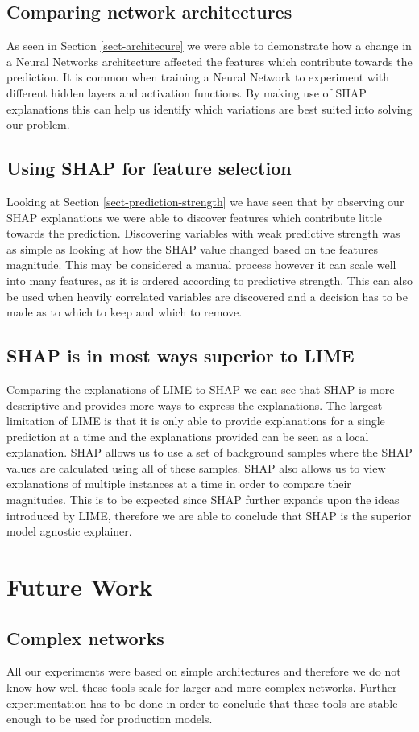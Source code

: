 \subsection{Comparing network architectures}
As seen in Section \ref{sect-architecure} we were able to demonstrate how a change in a Neural Networks architecture affected the features which contribute towards the prediction. It is common when training a Neural Network to experiment with different hidden layers and activation functions. By making use of SHAP explanations this can help us identify which variations are best suited into solving our problem.
\subsection{Using SHAP for feature selection}
Looking at Section \ref{sect-prediction-strength} we have seen that by observing our SHAP explanations we were able to discover features which contribute little towards the prediction. Discovering variables with weak predictive strength was as simple as looking at how the SHAP value changed based on the features magnitude. This may be considered a manual process however it can scale well into many features, as it is ordered according to predictive strength. This can also be used when heavily correlated variables are discovered and a decision has to be made as to which to keep and which to remove.
\subsection{SHAP is in most ways superior to LIME}
Comparing the explanations of LIME to SHAP we can see that SHAP is more descriptive and provides more ways to express the explanations. The largest limitation of LIME is that it is only able to provide explanations for a single prediction at a time and the explanations provided can be seen as a local explanation. SHAP allows us to use a set of background samples where the SHAP values are calculated using all of these samples. SHAP also allows us to view explanations of multiple instances at a time in order to compare their magnitudes. This is to be expected since SHAP further expands upon the ideas introduced by LIME, therefore we are able to conclude that SHAP is the superior model agnostic explainer.
\section{Future Work}
\subsection{Complex networks}
All our experiments were based on simple architectures and therefore we do not know how well these tools scale for larger and more complex networks. Further experimentation has to be done in order to conclude that these tools are stable enough to be used for production models.
